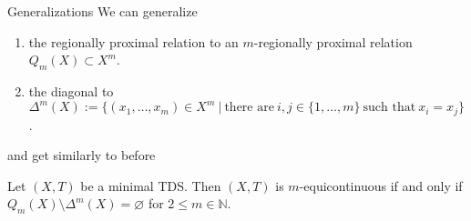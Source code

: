 \begin{frame}{Generalizations}
    We can generalize
    \begin{enumerate}
        \item the regionally proximal relation to an $m$-regionally proximal relation $Q_m(X) \subset X^{m}$.
        \item the diagonal to 
        $\Delta^m(X) := \{ (x_1, \dots, x_m) \in X^m \ | \ \text{there are} \ i, j \in \{1, \dots, m\} \ \text{such that} \ x_i = x_j \}$.
    \end{enumerate}
    and get similarly to before

    \begin{theorem}
	    \label{thm:m-equiRelationChar}
	    Let $(X, T)$ be a minimal TDS.
	    Then $(X, T)$ is $m$-equicontinuous if and only if $Q_m(X) \setminus \Delta^m(X) = \varnothing$ for $2 \leq m \in \mathbb{N}$.
    \end{theorem}
\end{frame}
